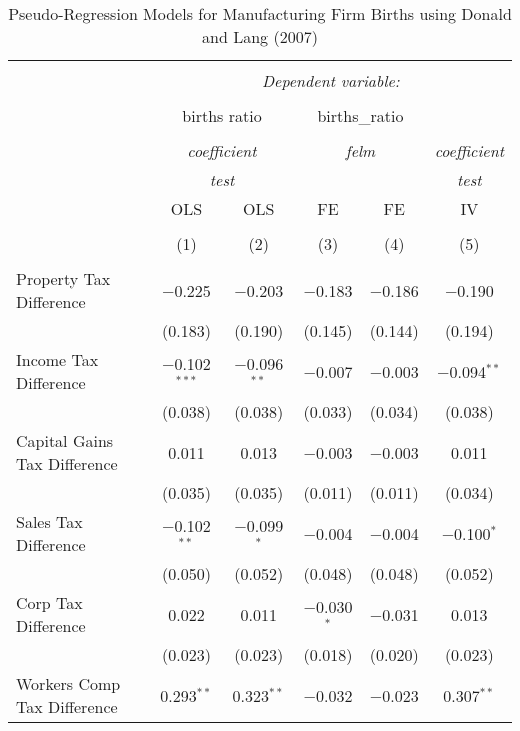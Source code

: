 
\begin{table}[!htbp] \centering 
  \caption{Pseudo-Regression Models for  Manufacturing Firm Births using Donald and Lang (2007)} 
  \label{} 
\begin{tabular}{@{\extracolsep{5pt}}lccccc} 
\\[-1.8ex]\hline 
\hline \\[-1.8ex] 
 & \multicolumn{5}{c}{\textit{Dependent variable:}} \\ 
\cline{2-6} 
\\[-1.8ex] & \multicolumn{2}{c}{births ratio} & \multicolumn{2}{c}{births\_ratio} &   \\ 
\\[-1.8ex] & \multicolumn{2}{c}{\textit{coefficient}} & \multicolumn{2}{c}{\textit{felm}} & \textit{coefficient} \\ 
 & \multicolumn{2}{c}{\textit{test}} & \multicolumn{2}{c}{\textit{}} & \textit{test} \\ 
 & OLS & OLS & FE & FE & IV \\ 
\\[-1.8ex] & (1) & (2) & (3) & (4) & (5)\\ 
\hline \\[-1.8ex] 
 Property Tax Difference & $-$0.225 & $-$0.203 & $-$0.183 & $-$0.186 & $-$0.190 \\ 
  & (0.183) & (0.190) & (0.145) & (0.144) & (0.194) \\ 
  Income Tax Difference & $-$0.102$^{***}$ & $-$0.096$^{**}$ & $-$0.007 & $-$0.003 & $-$0.094$^{**}$ \\ 
  & (0.038) & (0.038) & (0.033) & (0.034) & (0.038) \\ 
  Capital Gains Tax Difference & 0.011 & 0.013 & $-$0.003 & $-$0.003 & 0.011 \\ 
  & (0.035) & (0.035) & (0.011) & (0.011) & (0.034) \\ 
  Sales Tax Difference & $-$0.102$^{**}$ & $-$0.099$^{*}$ & $-$0.004 & $-$0.004 & $-$0.100$^{*}$ \\ 
  & (0.050) & (0.052) & (0.048) & (0.048) & (0.052) \\ 
  Corp Tax Difference & 0.022 & 0.011 & $-$0.030$^{*}$ & $-$0.031 & 0.013 \\ 
  & (0.023) & (0.023) & (0.018) & (0.020) & (0.023) \\ 
  Workers Comp Tax Difference & 0.293$^{**}$ & 0.323$^{**}$ & $-$0.032 & $-$0.023 & 0.307$^{**}$ \\ 

\end{tabular}
\end{table}
